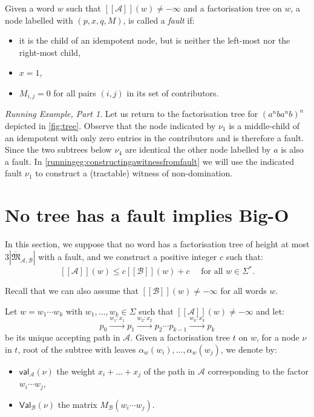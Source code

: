 \documentclass[10pt,a4paper]{amsart}
\theoremstyle{definition}
\numberwithin{equation}{section}
\theoremstyle{remark}
\newcommand{\ideal}{\mathfrak{M}}
\newcommand{\autA}{\mathcal{A}}
\newcommand{\autB}{\mathcal{B}}
\newcommand{\brfunc}[1]{[\![#1]\!]}
\newcommand{\funcA}{\brfunc{\autA}}
\newcommand{\funcB}{\brfunc{\autB}}
\newcommand{\aval}{\mathsf{val}_\autA}
\newcommand{\bval}{\mathsf{Val}_\autB}
\theoremstyle{remark}
\newtheorem{runningexample/}{Running Example, Part}
\newenvironment{runningexample}
  {\renewcommand{\qedsymbol}{\color{darkgray}\ensuremath{\lrcorner}}%
   \pushQED{\qed}\begin{runningexample/}}
  {\popQED\end{runningexample/}}
\begin{document}
Given a word $w$ such that $\funcA(w) \neq -\infty$ and a factorisation tree on $w$, a node labelled with $(p,x,q,M)$, is called a \emph{fault} if:
\begin{itemize}
\item it is the child of an idempotent node, but is neither the left-most nor the right-most child,
\item $x = 1$,
\item $M_{i,j} = 0$ for all pairs $(i,j)$ in its set of contributors.
\end{itemize}

\begin{runningexample}
Let us return to the factorisation tree for $(a^nba^nb)^n$ depicted in \cref{fig:tree}. Observe that the node indicated by $\nu_1$ is a middle-child of an idempotent with only zero entries in the contributors and is therefore a fault.
Since the two subtrees below $\nu_4$ are identical the other node labelled by $a$ is also a fault. In \cref{runningeg:constructingawitnessfromfault}  we will use the  indicated fault $\nu_1$ to construct a (tractable) witness of non-domination.
\end{runningexample}

\section{No tree has a fault implies Big-O}
\label{1implies4}
\setcounter{case}{0}

In this section, we suppose that no word has a factorisation tree of height at most $3|\overline{\ideal}_{\autA,\autB}|$ with a fault, and we construct a positive integer $c$ such that: 
\begin{equation}\label{eq:bigoformula}
\funcA(w) \leq c\funcB(w) + c \quad \text{ for all } w\in\Sigma^*.
\end{equation}

Recall that we can also assume that $\funcB(w) \neq -\infty$ for all words $w$.

Let $w = w_1\cdots w_k$ with $w_1, \ldots, w_k \in \Sigma$ such that $\funcA(w) \neq -\infty$ and let:
$$p_0 \xrightarrow{w_1:x_1} p_1 \xrightarrow{w_2:x_2} p_2 \dotsm p_{k-1}\xrightarrow{w_{k}:x_k} p_k$$ 
be its unique accepting path in $\autA$. Given a factorisation tree $t$ on $w$, for a node $\nu$ in $t$, root of the subtree with leaves $\alpha_w(w_i), \ldots, \alpha_w(w_j)$, we denote by:
\begin{itemize}
\item $\aval(\nu)$ the weight $x_i+ \ldots + x_j$ of the path in $\autA$ corresponding to the factor $w_i \cdots w_j$, 
\item $\bval(\nu)$ the matrix $M_\autB(w_i \cdots w_j)$.
\end{itemize}
\end{document}
